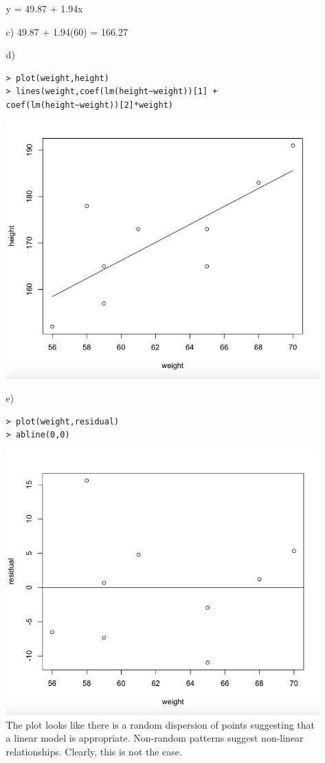 \documentclass[letterpaper,12pt]{article}
\begin{document}
\begin{enumerate}
\begin{enumerate}
y = 49.87 + 1.94x

\item[c)] 49.87 + 1.94(60) = 166.27

\item[d)]
\begin{lstlisting}
> plot(weight,height)
> lines(weight,coef(lm(height~weight))[1] +
coef(lm(height~weight))[2]*weight)
\end{lstlisting}
\includegraphics[scale = 0.4]{Plot}
\item[e)]
\begin{lstlisting}
> plot(weight,residual)
> abline(0,0)
\end{lstlisting}
\includegraphics[scale = 0.4]{Resid}\\
The plot looks like there is a random dispersion of points suggesting that a linear model is appropriate. Non-random patterns suggest non-linear relationships. Clearly, this is not the case.
\end{enumerate}
\end{enumerate}
\end{document}
